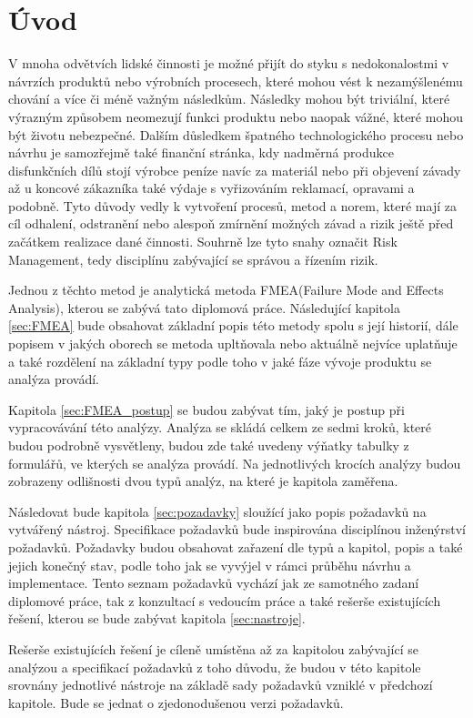 \chapter{Úvod}
\label{sec:Uvod}
V mnoha odvětvích lidské činnosti je možné přijít do styku s nedokonalostmi v návrzích produktů nebo výrobních procesech, které mohou vést k nezamýšlenému chování a více či méně važným následkům. Následky mohou být triviální, které výrazným způsobem neomezují funkci produktu nebo naopak vážné, které mohou být životu nebezpečné. Dalším důsledkem špatného technologického procesu nebo návrhu je samozřejmě také finanční stránka, kdy nadměrná produkce disfunkčních dílů stojí výrobce peníze navíc za materiál nebo při objevení závady až u koncové zákazníka také výdaje s vyřizováním reklamací, opravami a podobně. Tyto důvody vedly k vytvoření procesů, metod a norem, které mají za cíl odhalení, odstranění nebo alespoň zmírnění možných závad a rizik ještě před začátkem realizace dané činnosti. Souhrně lze tyto snahy označit Risk Management, tedy disciplínu zabývající se správou a řízením rizik. 

Jednou z těchto metod je analytická metoda FMEA(Failure Mode and Effects Analysis), kterou se zabývá tato diplomová práce. Následující kapitola  \ref{sec:FMEA} bude obsahovat základní popis této metody spolu s její historií, dále popisem v jakých oborech se metoda upltňovala nebo aktuálně nejvíce uplatňuje a také rozdělení na základní typy podle toho v jaké fáze vývoje produktu se analýza provádí.

Kapitola \ref{sec:FMEA_postup} se budou zabývat tím, jaký je postup při vypracovávání této analýzy. Analýza se skládá celkem ze sedmi kroků, které budou podrobně vysvětleny, budou zde také uvedeny výňatky tabulky z formulářů, ve kterých se analýza provádí. Na jednotlivých krocích analýzy budou zobrazeny odlišnosti dvou typů analýz, na které je kapitola zaměřena.

Následovat bude kapitola \ref{sec:pozadavky} sloužící jako popis požadavků na vytvářený nástroj. Specifikace požadavků bude inspirována disciplínou inženýrství požadavků. Požadavky budou obsahovat zařazení dle typů a kapitol, popis a také jejich konečný stav, podle toho jak se vyvýjel v rámci průběhu návrhu a implementace. Tento seznam požadavků vychází jak ze samotného zadaní diplomové práce, tak z konzultací s vedoucím práce a také rešerše existujících řešení, kterou se bude zabývat kapitola \ref{sec:nastroje}. 

Rešerše existujících řešení je cíleně umístěna až za kapitolou zabývající se analýzou a specifikací požadavků z toho důvodu, že budou v této kapitole srovnány jednotlivé nástroje na základě sady požadavků vzniklé v předchozí kapitole. Bude se jednat o zjedonodušenou verzi požadavků. 
\endinput